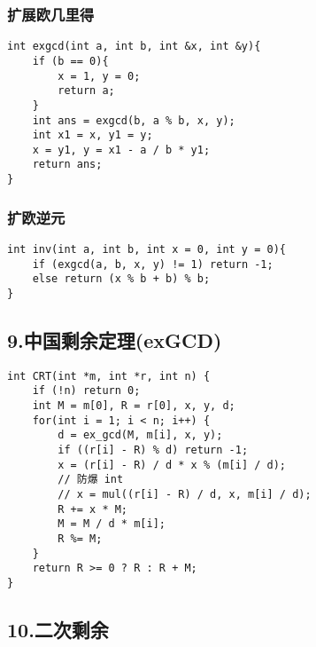 \documentclass[]{article}
\begin{document}
\hypertarget{ux6269ux5c55ux6b27ux51e0ux91ccux5f97-1}{%
\subsubsection{扩展欧几里得}\label{ux6269ux5c55ux6b27ux51e0ux91ccux5f97-1}}

\begin{verbatim}
int exgcd(int a, int b, int &x, int &y){
    if (b == 0){
        x = 1, y = 0;
        return a;
    }
    int ans = exgcd(b, a % b, x, y);
    int x1 = x, y1 = y;
    x = y1, y = x1 - a / b * y1;
    return ans;
}
\end{verbatim}

\hypertarget{ux6269ux6b27ux9006ux5143}{%
\subsubsection{扩欧逆元}\label{ux6269ux6b27ux9006ux5143}}

\begin{verbatim}
int inv(int a, int b, int x = 0, int y = 0){
    if (exgcd(a, b, x, y) != 1) return -1;
    else return (x % b + b) % b;
}
\end{verbatim}

\hypertarget{ux4e2dux56fdux5269ux4f59ux5b9aux7406exgcd}{%
\subsection{9.中国剩余定理(exGCD)}\label{ux4e2dux56fdux5269ux4f59ux5b9aux7406exgcd}}

\begin{verbatim}
int CRT(int *m, int *r, int n) {
    if (!n) return 0;
    int M = m[0], R = r[0], x, y, d;
    for(int i = 1; i < n; i++) {
        d = ex_gcd(M, m[i], x, y);
        if ((r[i] - R) % d) return -1;
        x = (r[i] - R) / d * x % (m[i] / d);
        // 防爆 int
        // x = mul((r[i] - R) / d, x, m[i] / d);
        R += x * M;
        M = M / d * m[i];
        R %= M;
    }
    return R >= 0 ? R : R + M;
}
\end{verbatim}

\hypertarget{ux4e8cux6b21ux5269ux4f59}{%
\subsection{10.二次剩余}\label{ux4e8cux6b21ux5269ux4f59}}
\end{document}
